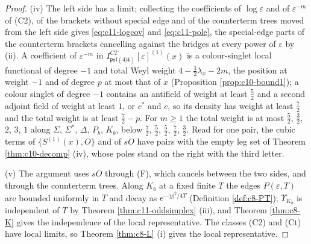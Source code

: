 \begin{proof}
(iv) The left side has a limit; collecting the coefficients of $\log\varepsilon$ and of $\varepsilon^{-m}$ of (C2), of the brackets without special edge and of the counterterm trees moved from the left side gives \eqref{eq:c11-logcov} and \eqref{eq:c11-pole}, the special-edge parts of the counterterm brackets cancelling against the bridges at every power of $\varepsilon$ by (ii). A coefficient of $\varepsilon^{-m}$ in $I^{CT}_{\mathfrak{psl}(4|4)}[\varepsilon]^{(1)}(x)$ is a colour-singlet local functional of degree $-1$ and total Weyl weight $4-\tfrac12\lambda_x-2m$, the position at weight $-1$ and of degree $p$ at most that of $x$ (Proposition \ref{prop:c10-bound1}); a colour singlet of degree $-1$ contains an antifield of weight at least $\tfrac52$ and a second adjoint field of weight at least $1$, or $c^*$ and $c$, so its density has weight at least $\tfrac72$ and the total weight is at least $\tfrac72-p$. For $m\ge1$ the total weight is at most $\tfrac52$, $\tfrac32$, $2$, $3$, $1$ along $\Sigma$, $\Sigma^*$, $\Delta$, $P_b$, $K_b$, below $\tfrac72$, $\tfrac52$, $\tfrac52$, $\tfrac72$, $\tfrac32$. Read for one pair, the cubic terms of $\{S^{(1)}(x),O\}$ and of $sO$ have pairs with the empty leg set of Theorem \ref{thm:c10-decomp} (iv), whose poles stand on the right with the third letter.

(v) The argument uses $sO$ through (F), which cancels between the two sides, and through the counterterm trees. Along $K_b$ at a fixed finite $T$ the edges $P(\varepsilon,T)$ are bounded uniformly in $T$ and decay as $e^{-|y|^2/4T}$ (Definition \ref{def:c8-PT}); $\Upsilon_{K_b}$ is independent of $T$ by Theorem \ref{thm:c11-oddsimplex} (iii), and Theorem \ref{thm:c8-K} gives the independence of the local representative. The classes (C2) and (Ct) have local limits, so Theorem \ref{thm:c8-L} (i) gives the local representative.
\end{proof}

